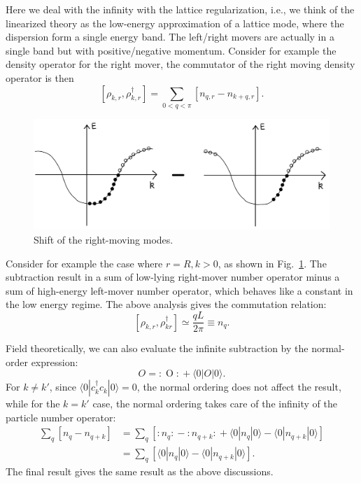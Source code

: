 Here we deal with the infinity with the lattice regularization, i.e., we think of the linearized theory as the low-energy approximation of a lattice mode, where the dispersion form a single energy band.
The left/right movers are actually in a single band but with positive/negative momentum.
Consider for example the density operator for the right mover, the commutator of the right moving density operator is then
\begin{equation}
	\left[\rho_{k,r}, \rho_{k,r}^\dagger \right] = \sum_{0<q<\pi} [n_{q,r}-n_{k+q,r}].
\end{equation}

\begin{figure}
	\centering
	\includegraphics[width=0.6\linewidth]{pics/BS-k-shift}
	\caption{Shift of the right-moving modes.}
	\label{fig:bs-k-shift}
\end{figure}

Consider for example the case where $r=R,k>0$, as shown in Fig.~\ref{fig:bs-k-shift}.
The subtraction result in a sum of low-lying right-mover number operator minus a sum of high-energy left-mover number operator, which behaves like a constant in the low energy regime. 
The above analysis gives the commutation relation:
\begin{equation}
	\left[\rho_{k,r}, \rho_{kr}^\dagger \right] \simeq \frac{qL}{2\pi} \equiv n_q.
\end{equation}

\begin{framedrmk}
Field theoretically, we can also evaluate the infinite subtraction by the normal-order expression:
\begin{equation}
	O = {:\mathrel{O}:} + \langle 0|O|0\rangle.
\end{equation}
For $k\ne k'$, since $\langle 0|c_k^\dagger c_k|0\rangle=0$, the normal ordering does not affect the result, while for the $k=k'$ case, the normal ordering takes care of the infinity of the particle number operator:
\begin{equation}
\begin{aligned}
	\sum_q [n_{q} - n_{q+k}]
	&= \sum_q \left[{:\mathrel{n_{q}}:} - {:\mathrel{n_{q+k}}:} 
		+ \langle0|n_{q}|0\rangle -\langle0|n_{q+k}|0\rangle \right] \\
	&= \sum_q [\langle0|n_{q}|0\rangle -\langle0|n_{q+k}|0\rangle].
\end{aligned}
\end{equation}
The final result gives the same result as the above discussions.
\end{framedrmk}

